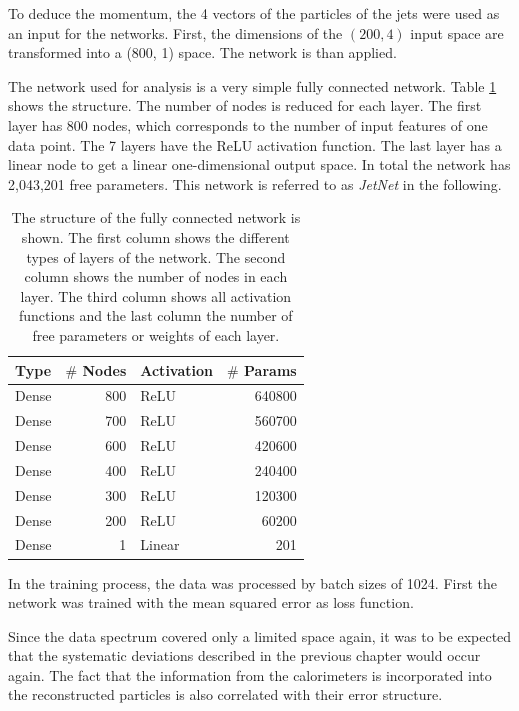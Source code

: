 \documentclass[12pt, a4paper]{thesis}
\begin{document}
To deduce the momentum, the 4 vectors of the particles of the jets
were used as an input for the networks. First, the dimensions of the
\((200, 4)\) input space are transformed into a (800, 1) space. The
network is than applied.

The network used for analysis is a very simple fully connected
network.  Table \ref{jet_fcn_structure} shows the structure. The number
of nodes is reduced for each layer.  The first layer has 800 nodes,
which corresponds to the number of input features of one data
point. The 7 layers have the ReLU activation function. The last layer
has a linear node to get a linear one-dimensional output space. In
total the network has 2,043,201 free parameters. This network is
referred to as \emph{JetNet} in the following.

\begin{table}[htbp]
  \label{jet_fcn_structure}
  \caption{ The structure of the fully connected network is shown. The
    first column shows the different types of layers of the
    network. The second column shows the number of nodes in each
    layer. The third column shows all activation functions and the
    last column the number of free parameters or weights of each
    layer.}
\centering
\begin{tabular}{lrlr}
Type & \(\#\) Nodes & Activation & \(\#\) Params\\
\hline
Dense & 800 & ReLU & 640800\\
Dense & 700 & ReLU & 560700\\
Dense & 600 & ReLU & 420600\\
Dense & 400 & ReLU & 240400\\
Dense & 300 & ReLU & 120300\\
Dense & 200 & ReLU & 60200\\
Dense & 1 & Linear & 201\\
\end{tabular}
\end{table}

In the training process, the data was processed by batch sizes
of 1024. First the network was trained with the mean squared error as
loss function.

Since the data spectrum covered only a limited space again, it was to
be expected that the systematic deviations described in the previous
chapter would occur again. The fact that the information from the
calorimeters is incorporated into the reconstructed particles is also
correlated with their error structure.
\end{document}
